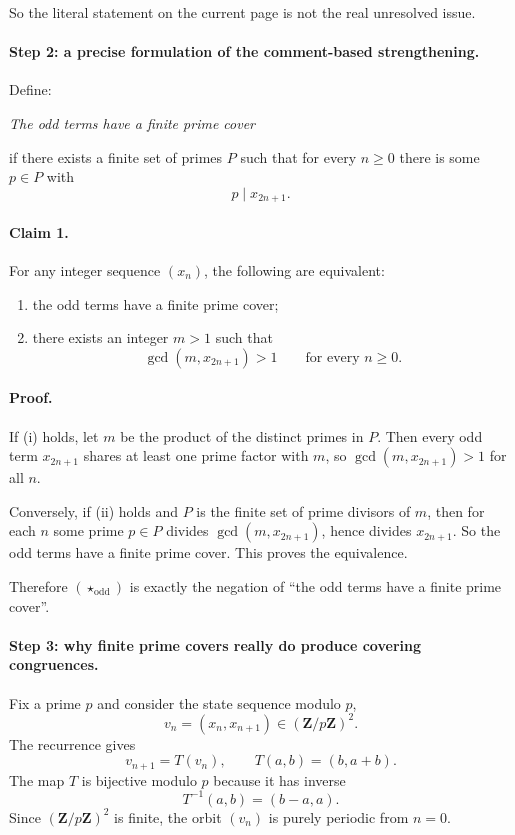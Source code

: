 So the literal statement on the current page is not the real unresolved issue.

\paragraph{Step 2: a precise formulation of the comment-based strengthening.}
Define:

\medskip
\centerline{\emph{The odd terms have a finite prime cover}}
\medskip

if there exists a finite set of primes $P$ such that for every $n\ge 0$ there is some $p\in P$ with
\[
p\mid x_{2n+1}.
\]

\paragraph{Claim 1.}
For any integer sequence $(x_n)$, the following are equivalent:

\begin{enumerate}
\item[(i)] the odd terms have a finite prime cover;
\item[(ii)] there exists an integer $m>1$ such that
\[
\gcd(m,x_{2n+1})>1 \qquad \mbox{for every }n\ge 0.
\]
\end{enumerate}

\paragraph{Proof.}
If (i) holds, let $m$ be the product of the distinct primes in $P$.  Then every odd term $x_{2n+1}$ shares at least one prime factor with $m$, so $\gcd(m,x_{2n+1})>1$ for all $n$.

Conversely, if (ii) holds and $P$ is the finite set of prime divisors of $m$, then for each $n$ some prime $p\in P$ divides $\gcd(m,x_{2n+1})$, hence divides $x_{2n+1}$.  So the odd terms have a finite prime cover.  This proves the equivalence.

Therefore $(\star_{\mathrm{odd}})$ is exactly the negation of ``the odd terms have a finite prime cover''.

\paragraph{Step 3: why finite prime covers really do produce covering congruences.}
Fix a prime $p$ and consider the state sequence modulo $p$,
\[
v_n=(x_n,x_{n+1}) \in (\mathbf Z/p\mathbf Z)^2.
\]
The recurrence gives
\[
v_{n+1}=T(v_n),\qquad T(a,b)=(b,a+b).
\]
The map $T$ is bijective modulo $p$ because it has inverse
\[
T^{-1}(a,b)=(b-a,a).
\]
Since $(\mathbf Z/p\mathbf Z)^2$ is finite, the orbit $(v_n)$ is purely periodic from $n=0$.

